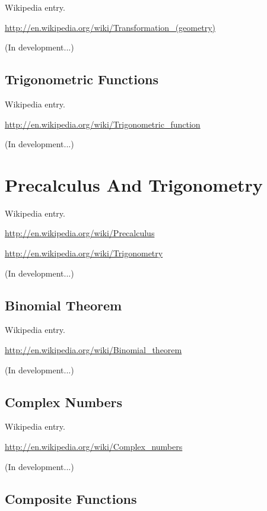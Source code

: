 \documentclass[12pt,oneside]{book}
\begin{document}
Wikipedia entry.

\href{http://en.wikipedia.org/wiki/Transformation_(geometry)}{http://en.wikipedia.org/wiki/Transformation\_(geometry)}

(In development...)

\subsection[Trigonometric Functions]{Trigonometric Functions}

Wikipedia entry.

\href{http://en.wikipedia.org/wiki/Trigonometric_function}{http://en.wikipedia.org/wiki/Trigonometric\_function}

(In development...)

\section[Precalculus And Trigonometry]{Precalculus And Trigonometry}

Wikipedia entry.

\href{http://en.wikipedia.org/wiki/Precalculus}{http://en.wikipedia.org/wiki/Precalculus}


\href{http://en.wikipedia.org/wiki/Trigonometry}{http://en.wikipedia.org/wiki/Trigonometry}

(In development...)

\subsection[Binomial Theorem]{Binomial Theorem}

Wikipedia entry.

\href{http://en.wikipedia.org/wiki/Binomial_theorem}{http://en.wikipedia.org/wiki/Binomial\_theorem}

(In development...)

\subsection[Complex Numbers]{Complex Numbers}

Wikipedia entry.

\href{http://en.wikipedia.org/wiki/Complex_numbers}{http://en.wikipedia.org/wiki/Complex\_numbers}

(In development...)

\subsection[Composite Functions]{Composite Functions}
\end{document}
